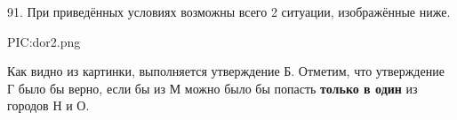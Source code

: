 91. При приведённых условиях возможны всего 2 ситуации, изображённые ниже.
\begin{center}
{{PIC:dor2.png}}
\end{center}
Как видно из картинки, выполняется утверждение Б. Отметим, что утверждение Г было бы верно, если бы из М можно было бы попасть {\bf только в один} из городов Н и О.\\
